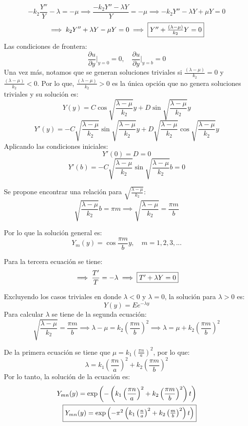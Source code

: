 \begin{solution}
$$-k_2\frac{Y''}{Y}-\lambda =-\mu\implies \frac{-k_2Y''-\lambda Y}{Y}=-\mu\implies -k_2Y''-\lambda Y+\mu Y= 0$$
$$\implies k_2Y'' +\lambda Y-\mu Y=0\implies \fbox{$Y''+\frac{(\lambda-\mu)}{k_2}Y=0$}$$
Las condiciones de frontera: 
$$\frac{\partial u}{\partial y}\Big|_{y=0}=0, \quad \frac{\partial u}{\partial y}\Big|_{y=b}=0 $$
Una vez más, notamos que se generan soluciones triviales si $\frac{(\lambda-\mu)}{k_2}=0$ y $\frac{(\lambda-\mu)}{k_2}<0$. Por lo que, $\frac{(\lambda-\mu)}{k_2}>0$ es la única opción que no genera soluciones triviales y su solución es: 
$$Y(y)= C\cos\sqrt{\frac{\lambda-\mu}{k_2}}y+D\sin\sqrt{\frac{\lambda-\mu}{k_2}}y$$
$$Y'(y)= -C\sqrt{\frac{\lambda-\mu}{k_2}}\sin\sqrt{\frac{\lambda-\mu}{k_2}}y + D\sqrt{\frac{\lambda-\mu}{k_2}}\cos \sqrt{\frac{\lambda-\mu}{k_2}}y$$
Aplicando las condiciones iniciales: 
$$Y'(0)= D =0$$
$$Y'(b)= -C\sqrt{\frac{\lambda-\mu}{k_2}}\sin\sqrt{\frac{\lambda-\mu}{k_2}}b=0$$

Se propone encontrar una relación para $\sqrt{\frac{\lambda-\mu}{k_2}}$:
$$\sqrt{\frac{\lambda-\mu}{k_2}}b=\pi m\implies\sqrt{\frac{\lambda-\mu}{k_2}}= \frac{\pi m}{b}$$

Por lo que la solución general es: 
$$Y_m(y)=\cos \frac{\pi m}{b} y,\quad m=1,2,3,...$$

\linea 

Para la tercera ecuación se tiene: 
$$\implies \frac{T'}{T}=-\lambda\implies \fbox{$T'+\lambda Y=0$}$$

Excluyendo los casos triviales en donde $\lambda<0$ y $\lambda=0$, la solución para $\lambda>0$ es: 
$$Y(y)= E e^{-\lambda y}$$
Para calcular $\lambda$ se tiene de la segunda ecuación: 
$$\sqrt{\frac{\lambda-\mu}{k_2}}= \frac{\pi m}{b}\implies \lambda - \mu = k_2\left(\frac{\pi m}{b}\right)^2 \implies \lambda = \mu +k_2\left(\frac{\pi m}{b}\right)^2$$

De la primera ecuación se tiene que $\mu= k_1\left(\frac{\pi n}{a}\right)^2$, por lo que: 
$$\lambda =k_1\left(\frac{\pi n}{a}\right)^2 +k_2\left(\frac{\pi m}{b}\right)^2 $$
Por lo tanto, la solución de la ecuación es: 
\begin{align*}
    Y_{mn}(y) =\exp\left(- \left(k_1\left(\frac{\pi n}{a}\right)^2 +k_2\left(\frac{\pi m}{b}\right)^2\right)t\right)\\
    \fbox{$Y_{mn}(y) = \exp\left(- \pi^2\left(k_1\left(\frac{ n}{a}\right)^2 +k_2\left(\frac{ m}{b}\right)^2\right)t\right)$}
\end{align*}

\linea 


\end{solution}
